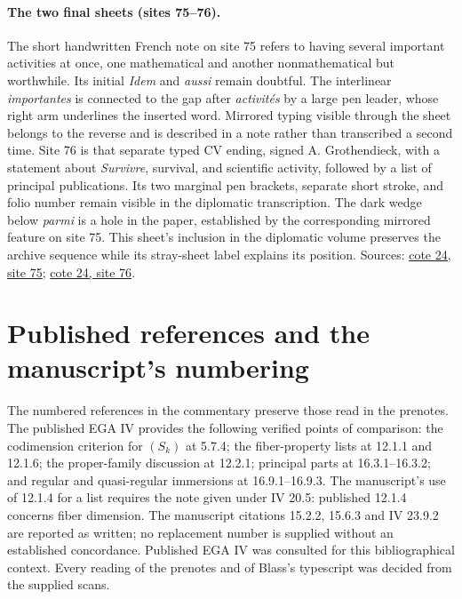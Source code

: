 \documentclass[10pt,a4paper]{article}
\begin{document}
\paragraph{The two final sheets (sites 75--76).}
The short handwritten French note on site 75 refers to having several important activities at once, one mathematical and another nonmathematical but worthwhile. Its initial \emph{Idem} and \emph{aussi} remain doubtful. The interlinear \emph{importantes} is connected to the gap after \emph{activités} by a large pen leader, whose right arm underlines the inserted word. Mirrored typing visible through the sheet belongs to the reverse and is described in a note rather than transcribed a second time. Site 76 is that separate typed CV ending, signed A. Grothendieck, with a statement about \emph{Survivre}, survival, and scientific activity, followed by a list of principal publications. Its two marginal pen brackets, separate short stroke, and folio number remain visible in the diplomatic transcription. The dark wedge below \emph{parmi} is a hole in the paper, established by the corresponding mirrored feature on site 75. This sheet's inclusion in the diplomatic volume preserves the archive sequence while its stray-sheet label explains its position. Sources: \href{https://grothendieck.umontpellier.fr/web/viewer.html?file=../24.pdf\#page=76}{cote 24, site 75}; \href{https://grothendieck.umontpellier.fr/web/viewer.html?file=../24.pdf\#page=77}{cote 24, site 76}.
\par{}

\par{}
\section*{Published references and the manuscript's numbering}
The numbered references in the commentary preserve those read in the prenotes. The published EGA IV provides the following verified points of comparison: the codimension criterion for $(S_k)$ at 5.7.4; the fiber-property lists at 12.1.1 and 12.1.6; the proper-family discussion at 12.2.1; principal parts at 16.3.1--16.3.2; and regular and quasi-regular immersions at 16.9.1--16.9.3. The manuscript's use of 12.1.4 for a list requires the note given under IV 20.5: published 12.1.4 concerns fiber dimension. The manuscript citations 15.2.2, 15.6.3 and IV 23.9.2 are reported as written; no replacement number is supplied without an established concordance. Published EGA IV was consulted for this bibliographical context. Every reading of the prenotes and of Blass's typescript was decided from the supplied scans.
\end{document}
